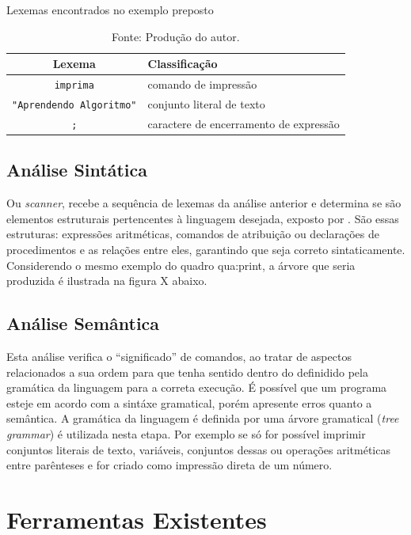 \begin{table}[h]
\centering
  \caption{Lexemas encontrados no exemplo preposto}\label{tab:lexemas}
\begin{tabular}{ c | l }\hline
\textbf{Lexema} & \textbf{Classificação} \\ \hline
\texttt{imprima} & comando de impressão \\ \hline
\texttt{"Aprendendo Algoritmo"} & conjunto literal de texto \\ \hline
\texttt{;} & caractere de encerramento de expressão \\ \hline
\end{tabular}
  \caption*{\ifdraft{\color{green}}{}\footnotesize Fonte: Produção do autor.}
\end{table}

\subsection{Análise Sintática}

Ou \textit{scanner}, recebe a sequência de lexemas da análise anterior e determina se são elementos estruturais pertencentes à linguagem desejada, exposto por . São essas estruturas: expressões aritméticas, comandos de atribuição ou declarações de procedimentos e as relações entre eles, garantindo que seja correto sintaticamente. Considerendo o mesmo exemplo do quadro {qua:print}, a árvore que seria produzida é ilustrada na figura X abaixo.

\subsection{Análise Semântica}

Esta análise verifica o ``significado'' de comandos, ao tratar de aspectos relacionados a sua ordem para que tenha sentido dentro do definidido pela gramática da linguagem para a correta execução. É possível que um programa esteje em acordo com a sintáxe gramatical, porém apresente erros quanto a semântica. A gramática da linguagem é definida por uma árvore gramatical (\textit{tree grammar}) é utilizada nesta etapa. Por exemplo se só for possível imprimir conjuntos literais de texto, variáveis, conjuntos dessas ou operações aritméticas entre parênteses e for criado como impressão direta de um número.

\section{Ferramentas Existentes}

